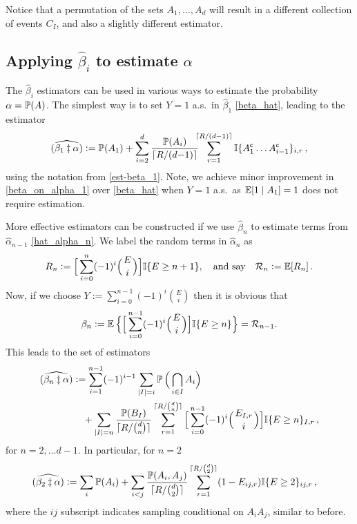 Notice that a permutation of the sets $A_1,\dots,A_d$ will result in
a different collection of events $C_I$, and also a slightly different estimator.  

\subsection{Applying $\hat{\beta}_i$ to estimate $\alpha$}

The $\hat{\beta}_i$ estimators can be used in various ways to estimate the probability
$\alpha=\operatorname{{\mathbb P}}(A)$. The simplest way is to set $Y=1$ a.s.\ in $\hat{\beta}_1$ \eqref{beta_hat},
leading to the estimator 
\begin{align} \label{beta_on_alpha_1}
\widehat{(\beta_1 \ddagger \alpha)} := \operatorname{{\mathbb P}}(A_1) +  
\sum_{i=2}^d \frac{\operatorname{{\mathbb P}}(A_i)}{\lceil R/(d{-}1) \rceil} \hspace{-5pt} \sum_{r=1}^{\lceil R/(d{-}1) \rceil} 
	\mathbb I\{A_1^{\mathsf{c}} \dots A_{i-1}^{\mathsf{c}}\}_{i,r}  \,,
\end{align}
using the notation from \eqref{est-beta_1}. Note, we achieve minor improvement in \eqref{beta_on_alpha_1} over \eqref{beta_hat} when $Y=1$ a.s.\ as $\operatorname{{\mathbb E}}[1 \mid A_1] = 1$ does not require estimation.

More effective estimators can be constructed if we use $\hat{\beta}_n$ to estimate terms from $\hat{\alpha}_{n-1}$ \eqref{hat_alpha_n}.
We label the random terms in $\hat{\alpha}_n$ as
\begin{equation}\label{residual}
 R_n := \Big[ \sum_{i=0}^n (-1)^{i} \Bigl({{E}\atop i}\Bigr) \Big] \mathbb I\{ E \ge n+1\}, \quad \text{and say} \quad \mathcal{R}_n :=\operatorname{{\mathbb E}}[R_n] \,.
\end{equation}
Now, if we choose $Y:=\sum_{i=0}^{n-1} (-1)^{i} \binom{E}{i}$ then it is obvious that
\begin{equation*}
 \beta_n:=\operatorname{{\mathbb E}}\Big\{ \Big[ \sum_{i=0}^{n-1} (-1)^{i} \Bigl({{E}\atop i}\Bigr) \Big] \mathbb I\{ E \ge n\}\Big\}=\mathcal{R}_{n-1}.
\end{equation*}
This leads to the set of estimators
\begin{align*}
	\widehat{(\beta_n \ddagger \alpha)} 
	&:= \sum_{i=1}^{n-1} (-1)^{i-1} \sum_{|I|=i} \operatorname{{\mathbb P}}\Big( \bigcap_{i\in I} A_i \Big) \\
	&\quad +
	\sum_{|I|=n} \frac{ \operatorname{{\mathbb P}}(B_I) }{\lceil R/\binom{d}{n} \rceil} 
   \sum_{r=1}^{\lceil R/\binom{d}{n} \rceil}
   \Big[ \sum_{i=0}^{n-1} (-1)^{i} \Bigl({{E_{I,r}}\atop i}\Bigr) \Big]
	\mathbb I\{ E \ge n \}_{I,r} \,, 
\end{align*}%
for $n = 2, \dots d-1$.
In particular, for $n=2$
\begin{align} \label{beta_on_alpha_2}
	\widehat{(\beta_2 \ddagger \alpha)} 
	&:= \sum_i \operatorname{{\mathbb P}}(A_i) + 
	\sum_{i<j} \frac{ \operatorname{{\mathbb P}}(A_i, A_j) }{\lceil R/\binom{d}{2} \rceil} 
   \sum_{r=1}^{\lceil R/\binom{d}{2} \rceil}
   (1 - E_{ij,r}) \mathbb I\{ E \ge 2 \}_{ij,r} \,, 
\end{align}
where the $ij$ subscript indicates sampling conditional on $A_iA_j$, similar to before.

